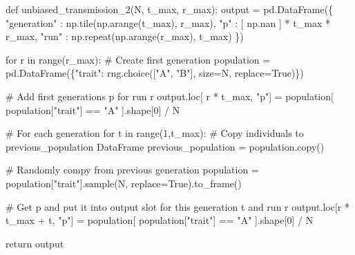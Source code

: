 \documentclass[
  a4paperpaper,
  ,captions=tableheading
]{scrbook}
\newenvironment{Shaded}{\begin{snugshade}}{\end{snugshade}}
\newcommand{\BuiltInTok}[1]{\textcolor[rgb]{0.00,0.23,0.31}{#1}}
\newcommand{\CommentTok}[1]{\textcolor[rgb]{0.37,0.37,0.37}{#1}}
\newcommand{\ControlFlowTok}[1]{\textcolor[rgb]{0.00,0.23,0.31}{#1}}
\newcommand{\DecValTok}[1]{\textcolor[rgb]{0.68,0.00,0.00}{#1}}
\newcommand{\KeywordTok}[1]{\textcolor[rgb]{0.00,0.23,0.31}{#1}}
\newcommand{\NormalTok}[1]{\textcolor[rgb]{0.00,0.23,0.31}{#1}}
\newcommand{\OperatorTok}[1]{\textcolor[rgb]{0.37,0.37,0.37}{#1}}
\newcommand{\StringTok}[1]{\textcolor[rgb]{0.13,0.47,0.30}{#1}}
\newcommand{\VariableTok}[1]{\textcolor[rgb]{0.07,0.07,0.07}{#1}}
\begin{document}
\begin{Shaded}
\begin{Highlighting}[]
\KeywordTok{def}\NormalTok{ unbiased\_transmission\_2(N, t\_max, r\_max):}
\NormalTok{    output }\OperatorTok{=}\NormalTok{ pd.DataFrame(\{}
        \StringTok{"generation"}\NormalTok{ : np.tile(np.arange(t\_max), r\_max),}
        \StringTok{"p"}\NormalTok{ : [ np.nan ] }\OperatorTok{*}\NormalTok{ t\_max }\OperatorTok{*}\NormalTok{ r\_max,}
        \StringTok{"run"}\NormalTok{ : np.repeat(np.arange(r\_max), t\_max)}
\NormalTok{    \})}

    \ControlFlowTok{for}\NormalTok{ r }\KeywordTok{in} \BuiltInTok{range}\NormalTok{(r\_max):}
        \CommentTok{\# Create first generation}
\NormalTok{        population }\OperatorTok{=}\NormalTok{ pd.DataFrame(\{}\StringTok{"trait"}\NormalTok{: rng.choice([}\StringTok{"A"}\NormalTok{, }\StringTok{"B"}\NormalTok{], size}\OperatorTok{=}\NormalTok{N, replace}\OperatorTok{=}\VariableTok{True}\NormalTok{)\})}

        \CommentTok{\# Add first generation\textquotesingle{}s p for run r}
\NormalTok{        output.loc[ r }\OperatorTok{*}\NormalTok{ t\_max, }\StringTok{"p"}\NormalTok{] }\OperatorTok{=}\NormalTok{ population[ population[}\StringTok{"trait"}\NormalTok{] }\OperatorTok{==} \StringTok{"A"}\NormalTok{ ].shape[}\DecValTok{0}\NormalTok{] }\OperatorTok{/}\NormalTok{ N}

        \CommentTok{\# For each generation }
        \ControlFlowTok{for}\NormalTok{ t }\KeywordTok{in} \BuiltInTok{range}\NormalTok{(}\DecValTok{1}\NormalTok{,t\_max):}
            \CommentTok{\# Copy individuals to previous\_population DataFrame}
\NormalTok{            previous\_population }\OperatorTok{=}\NormalTok{ population.copy()}

            \CommentTok{\# Randomly compy from previous generation }
\NormalTok{            population }\OperatorTok{=}\NormalTok{ population[}\StringTok{"trait"}\NormalTok{].sample(N, replace}\OperatorTok{=}\VariableTok{True}\NormalTok{).to\_frame()}

            \CommentTok{\# Get p and put it into output slot for this generation t and run r}
\NormalTok{            output.loc[r }\OperatorTok{*}\NormalTok{ t\_max }\OperatorTok{+}\NormalTok{ t, }\StringTok{"p"}\NormalTok{] }\OperatorTok{=}\NormalTok{ population[ population[}\StringTok{"trait"}\NormalTok{] }\OperatorTok{==} \StringTok{"A"}\NormalTok{ ].shape[}\DecValTok{0}\NormalTok{] }\OperatorTok{/}\NormalTok{ N}

    \ControlFlowTok{return}\NormalTok{ output}
\end{Highlighting}
\end{Shaded}
\end{document}

